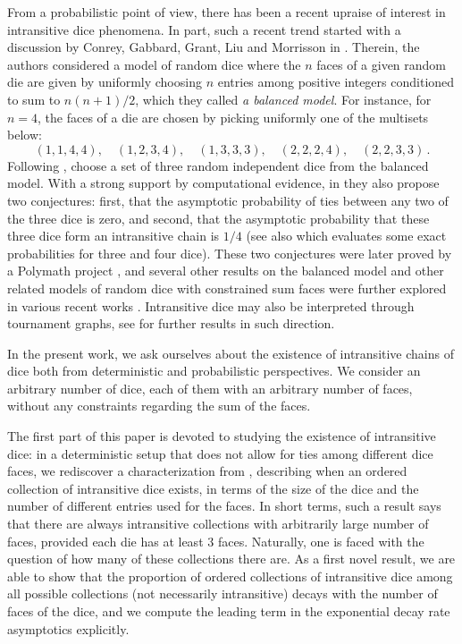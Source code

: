 \documentclass[reqno,a4paper,11pt]{amsart}
\theoremstyle{remark}
\numberwithin{equation}{section}
\begin{document}
From a probabilistic point of view, there has been a recent upraise of interest
in intransitive dice phenomena. In part, such a recent trend started with a
discussion by Conrey, Gabbard, Grant, Liu and Morrisson in  \cite{CGGLM}. Therein, the authors considered a model of random dice where the $n$ faces of a given random die are given by uniformly choosing $n$ entries among positive integers conditioned to sum to $n(n+1)/2$, which they called \textit{a balanced model}. For instance, for $n=4$, the faces of a die are chosen by picking uniformly one of the  multisets below:
\begin{equation*}
(1, 1, 4, 4),\quad (1, 2, 3, 4),\quad (1, 3, 3, 3),\quad (2, 2, 2, 4), \quad (2, 2, 3, 3)\,.
\end{equation*}
Following \cite{CGGLM}, choose a set of three random independent dice from the balanced model. With a strong support by computational evidence, in \cite{CGGLM} they also propose two conjectures: first, that the asymptotic probability of ties between any two of the three dice is zero, and second, that the asymptotic probability that these three dice form an intransitive chain is $1/4$ (see also \cite{Morrison} which evaluates some exact probabilities for three and four dice). These two conjectures were later proved by a Polymath project \cite{polymath}, and several other results on the balanced model and other related models of random dice with constrained sum faces were further explored in various recent works \cite{PTRF2}. Intransitive dice may also be interpreted through tournament graphs, see \cite{Akin21, AkinSaccamano21} for further results in such direction.

In the present work, we ask ourselves about the existence of intransitive chains of dice both from deterministic and probabilistic perspectives. We consider an arbitrary number of dice, each of them with an arbitrary number of faces, without any constraints regarding the sum of the faces.

The first part of this paper is devoted to studying the existence of intransitive dice: in a deterministic setup that does not allow for ties among different dice faces, we rediscover a characterization from \cite{Schaefer}, describing when an ordered collection of intransitive dice exists, in terms of the size of the dice and the number of different entries used for the faces. In short terms, such a result says that there are always intransitive collections with arbitrarily large number of faces, provided each die has at least $3$ faces. Naturally, one is faced with the question of how many of these collections there are. As a first novel result, we are able to show that the proportion of ordered collections of intransitive dice among all possible collections (not necessarily intransitive) decays with the number of faces of the dice, and we compute the leading term in the exponential decay rate asymptotics explicitly.
\end{document}
